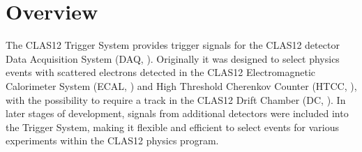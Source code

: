 \section{Overview}

The CLAS12 Trigger System provides trigger signals for the CLAS12 detector Data Acquisition System (DAQ, \cite{daq-ref}). Originally it was designed to select physics events with scattered electrons detected in the CLAS12 Electromagnetic Calorimeter System (ECAL, \cite{ec-ref}) and High Threshold Cherenkov Counter (HTCC, \cite{htcc-ref}), with the possibility to require a track in the CLAS12 Drift Chamber (DC, \cite{dc-ref}). In later stages of development, signals from additional detectors were included into the Trigger System, making it flexible and efficient to select events for various experiments within the CLAS12 physics program.



